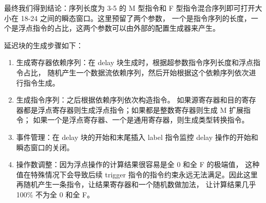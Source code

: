 \begin{table}[h!]
    \begin{center} 
    \caption{整数指令组合} 
    \label{table:int-seq}  
    \end{center}
\end{table}

最终我们得到结论：序列长度为 3-5 的 M 型指令和 F 型指令混合序列即可打开大小在 18-24 之间的瞬态窗口。这里预留了两个参数，
一个是指令序列的长度，一个是浮点指令的占比，这两个参数可以由外部的配置生成器来产生。\par

延迟块的生成步骤如下：
\begin{enumerate}
    \item 生成寄存器依赖序列：在 delay 块生成时，根据超参数指令序列长度和浮点指令占比，
随机产生一个数据流依赖序列，然后开始根据这个依赖序列依次进行指令生成。\par

    \item 生成指令序列：之后根据依赖序列依次构造指令。
如果源寄存器和目的寄存器都是浮点寄存器则生成浮点指令；如果都是整数寄存器则生成 M 扩展指令；
如果一个是浮点寄存器、一个是通用寄存器，则生成类型转换指令。\par

    \item 事件管理：在 delay 块的开始和末尾插入 label 指令监控 delay 操作的开始和瞬态窗口的关闭。\par

    \item 操作数调整：因为浮点操作的计算结果很容易是全 0 和全 F 的极端值，
这种值在特殊情况下会导致后续 trigger 指令的指令约束永远无法满足。因此这里再随机产生一条指令，让结果寄存器和一个随机数做加法，
让计算结果几乎 100\% 不为全 0 和全 F。\par
\end{enumerate}

